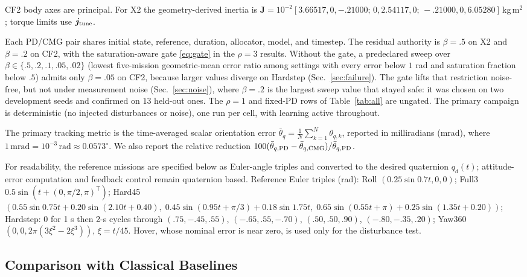 \documentclass[letterpaper, 10 pt, conference]{ieeeconf}
\newcommand{\T}{^{\mathsf T}}
\begin{document}
CF2 body axes are principal. For X2 the geometry-derived inertia is
$\bm J=10^{-2}[3.66517,0,-.21000;\allowbreak\,0,2.54117,0;\allowbreak\,-.21000,0,6.05280]$\,kg\,m$^2$;
torque limits use $\bm j_{\rm tune}$.

Each PD/CMG pair shares initial state, reference, duration, allocator, model, and timestep. The residual authority is $\beta=.5$ on X2 and $\beta=.2$ on CF2, with the saturation-aware gate \eqref{eq:gate} in the $\rho=3$ results. Without the gate, a predeclared sweep over $\beta\in\{.5,.2,.1,.05,.02\}$ (lowest five-mission geometric-mean error ratio among settings with every error below $1$ rad and saturation fraction below $.5$) admits only $\beta=.05$ on CF2, because larger values diverge on Hardstep (Sec.~\ref{sec:failure}). The gate lifts that restriction noise-free, but not under measurement noise (Sec.~\ref{sec:noise}), where $\beta=.2$ is the largest sweep value that stayed safe: it was chosen on two development seeds and confirmed on $13$ held-out ones. The $\rho=1$ and fixed-PD rows of Table~\ref{tab:all} are ungated. The primary campaign is deterministic (no injected disturbances or noise), one run per cell, with learning active throughout.

The primary tracking metric is the time-averaged scalar orientation error $\bar{\theta}_q=\frac{1}{N}\sum_{k=1}^{N}\theta_{q,k}$, reported in milliradians (mrad), where $1\,\mathrm{mrad}=10^{-3}\,\mathrm{rad}\approx0.0573^\circ$. We also report the relative reduction $100(\bar\theta_{q,\rm PD}-\bar\theta_{q,\rm CMG})/\bar\theta_{q,\rm PD}$.

For readability, the reference missions are specified below as Euler-angle
triples and converted to the desired quaternion $q_d(t)$; attitude-error
computation and feedback control remain quaternion based.
Reference Euler triples (rad): Roll $(0.25\sin0.7t,0,0)$; Full3 $0.5\sin(t+(0,\pi/2,\pi)\T)$; Hard45
$(0.55\sin0.75t+0.20\sin(2.10t+0.40),\allowbreak\;0.45\sin(0.95t+\pi/3)+0.18\sin1.75t,\allowbreak\;0.65\sin(0.55t+\pi)+0.25\sin(1.35t+0.20))$;
Hardstep: $0$ for 1 s then 2-s cycles through $(.75,-.45,.55)$, $(-.65,.55,-.70)$, $(.50,.50,.90)$, $(-.80,-.35,.20)$; Yaw360 $(0,0,2\pi(3\xi^2-2\xi^3))$, $\xi=t/45$. Hover, whose nominal error is near zero, is used only for the disturbance test.



\subsection{Comparison with Classical Baselines}
\label{sec:baselines}
\end{document}
